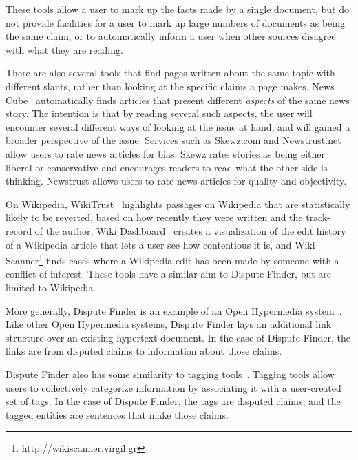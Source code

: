 \documentclass{www2010-submission}
\newcommand{\todo}[1]{}
\begin{document}
These tools allow a user to mark up the facts made by a single document, but do not provide facilities for a user to mark up large numbers of documents as being the same claim, or to automatically inform a user when other sources disagree with what they are reading.

There are also several tools that find pages written about the same topic with different slants, rather than looking at the specific claims a page makes. News Cube~\cite{Park2009} automatically finds articles that present different {\it aspects} of the same news story. The intention is that by reading several such aspects, the user will encounter several different ways of looking at the issue at hand, and will gained a broader perspective of the issue. 
Services such as Skewz.com and Newstrust.net allow users to rate news articles for bias. Skewz rates stories as being either liberal or conservative and encourages readers to read what the other side is thinking. Newstrust allows users to rate news articles for quality and objectivity. 

On Wikipedia, WikiTrust~\cite{Adler2008a} highlights passages on Wikipedia that are statistically likely to be reverted, based on how recently they were written and the track-record of the author, Wiki Dashboard~\cite{Kittur2008} creates a visualization of the edit history of a Wikipedia article that lets a user see how contentious it is, and Wiki Scanner\footnote{http://wikiscanner.virgil.gr} finds cases where a Wikipedia edit has been made by someone with a conflict of interest. These tools have a similar aim to Dispute Finder, but are limited to Wikipedia.

More generally, Dispute Finder is an example of an Open Hypermedia system~\cite{Bouvin2000,Wiil1996}. Like other Open Hypermedia systems, Dispute Finder lays an additional link structure over an existing hypertext document. In the case of Dispute Finder, the links are from disputed claims to information about those claims.

Dispute Finder also has some similarity to tagging tools~\cite{Marlow2006,Golder2006}. Tagging tools allow users to collectively categorize information by associating it with a user-created set of tags. In the case of Dispute Finder, the tags are disputed claims, and the tagged entities are sentences that make those claims. 


\todo{Improve the paraphraser UI so it shows users what pages are making the claim}
\todo{Improve the ``see examples on the web'' UI to it shows the pages that were found with the activists training work}
\todo{Provide a customized RSS reader and search engine that does dispute tracking. - future work?}
\todo{Should we explicitly list what we think are our key contributions?}
\end{document}
